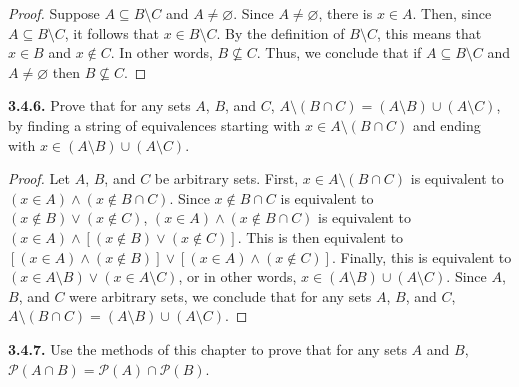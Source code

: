 \documentclass[12pt]{amsart}
\newenvironment{statement}[1]{\smallskip\noindent\color[rgb]{.6627, .3529, .6314} {\bf #1.}}{}
\theoremstyle{definition}
\theoremstyle{remark}
\newcommand{\powerset}[1]{\mathscr{P} \left( #1 \right)}
\begin{document}
\begin{proof}
Suppose $A \subseteq B \setminus C$ and $A \neq \varnothing$.
Since $A \neq \varnothing$, there is $x \in A$.
Then, since $A \subseteq B \setminus C$, it follows that $x \in B \setminus C$.
By the definition of $B \setminus C$, this means that $x \in B$ and $x \notin C$.
In other words, $B \nsubseteq C$.
Thus, we conclude that if $A \subseteq B \setminus C$ and $A \neq \varnothing$ then $B \nsubseteq C$.
\end{proof}


\begin{statement}{3.4.6}
Prove that for any sets $A$, $B$, and $C$, $A \setminus (B \cap C) = (A \setminus B) \cup (A \setminus C)$, by finding a string of equivalences starting with $x \in A \setminus (B \cap C)$ and ending with $x \in (A \setminus B) \cup (A \setminus C)$.
\end{statement}

\begin{proof}
Let $A$, $B$, and $C$ be arbitrary sets.
First, $x \in A \setminus (B \cap C)$ is equivalent to $(x \in A) \wedge (x \notin B \cap C)$.
Since $x \notin B \cap C$ is equivalent to $(x \notin B) \vee (x \notin C)$, $(x \in A) \wedge (x \notin B \cap C)$ is equivalent to $(x \in A) \wedge [(x \notin B) \vee (x \notin C)]$.
This is then equivalent to $[(x \in A) \wedge (x \notin B)] \vee [(x \in A) \wedge (x \notin C)]$.
Finally, this is equivalent to $(x \in A \setminus B) \vee (x \in A \setminus C)$, or in other words, $x \in (A \setminus B) \cup (A \setminus C)$.
Since $A$, $B$, and $C$ were arbitrary sets, we conclude that for any sets $A$, $B$, and $C$, $A \setminus (B \cap C) = (A \setminus B) \cup (A \setminus C)$.
\end{proof}


\begin{statement}{3.4.7}
Use the methods of this chapter to prove that for any sets $A$ and $B$, $\powerset{A \cap B} = \powerset{A} \cap \powerset{B}$.
\end{statement}
\end{document}
